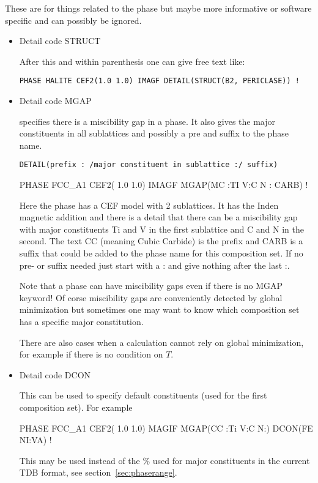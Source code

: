 \documentclass[12pt]{article}
\begin{document}
These are for things related to the phase but maybe more informative
or software specific and can possibly be ignored.

\begin{itemize}
\item Detail code STRUCT

After this and within parenthesis one can give free text like:
\begin{verbatim}
PHASE HALITE CEF2(1.0 1.0) IMAGF DETAIL(STRUCT(B2, PERICLASE)) !
\end{verbatim}


\item Detail code MGAP 

  specifies there is a miscibility gap in a phase.  It also gives the
  major constituents in all sublattices and possibly a pre and suffix
  to the phase name.
\begin{verbatim}
DETAIL(prefix : /major constituent in sublattice :/ suffix)
\end{verbatim}

  PHASE FCC\_A1 CEF2( 1.0 1.0) IMAGF MGAP(MC :TI V:C N : CARB) !

  Here the phase has a CEF model with 2 sublattices.  It has the Inden
  magnetic addition and there is a detail that there can be a
  miscibility gap with major constituents Ti and V in the first
  sublattice and C and N in the second.  The text CC (meaning Cubic
  Carbide) is the prefix and CARB is a suffix that could be added to
  the phase name for this composition set.  If no pre- or suffix
  needed just start with a : and give nothing after the last :.

  Note that a phase can have miscibility gaps even if there is no MGAP
  keyword!  Of corse miscibility gaps are conveniently detected by
  global minimization but sometimes one may want to know which
  composition set has a specific major constitution.

  There are also cases when a calculation cannot rely on global
  minimization, for example if there is no condition on $T$.

\item Detail code DCON

  This can be used to specify default constituents (used for the first
  composition set).  For example

  PHASE FCC\_A1 CEF2( 1.0 1.0) MAGIF MGAP(CC :Ti V:C N:) DCON(FE NI:VA) !

  This may be used instead of the \% used for major constituents in
  the current TDB format, see section~\ref{sec:phaserange}.

\end{itemize}
\end{document}
